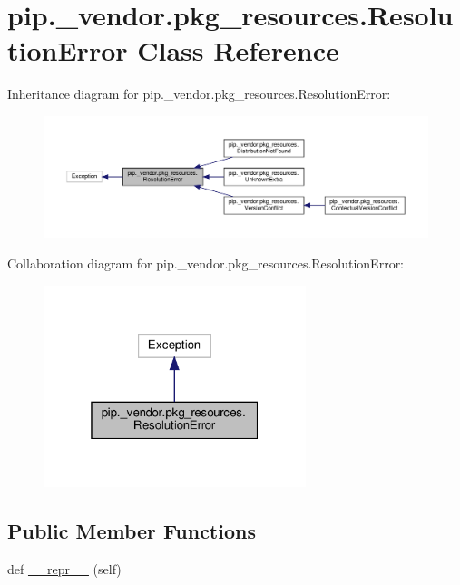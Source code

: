 \hypertarget{classpip_1_1__vendor_1_1pkg__resources_1_1ResolutionError}{}\section{pip.\+\_\+vendor.\+pkg\+\_\+resources.\+Resolution\+Error Class Reference}
\label{classpip_1_1__vendor_1_1pkg__resources_1_1ResolutionError}


Inheritance diagram for pip.\+\_\+vendor.\+pkg\+\_\+resources.\+Resolution\+Error\+:
\nopagebreak
\begin{figure}[H]
\begin{center}
\leavevmode
\includegraphics[width=350pt]{classpip_1_1__vendor_1_1pkg__resources_1_1ResolutionError__inherit__graph}
\end{center}
\end{figure}


Collaboration diagram for pip.\+\_\+vendor.\+pkg\+\_\+resources.\+Resolution\+Error\+:
\nopagebreak
\begin{figure}[H]
\begin{center}
\leavevmode
\includegraphics[width=217pt]{classpip_1_1__vendor_1_1pkg__resources_1_1ResolutionError__coll__graph}
\end{center}
\end{figure}
\subsection*{Public Member Functions}
\begin{DoxyCompactItemize}
\item 
def \hyperlink{classpip_1_1__vendor_1_1pkg__resources_1_1ResolutionError_aead9cc6894a855ac6734326541aa7f2f}{\+\_\+\+\_\+repr\+\_\+\+\_\+} (self)
\end{DoxyCompactItemize}


